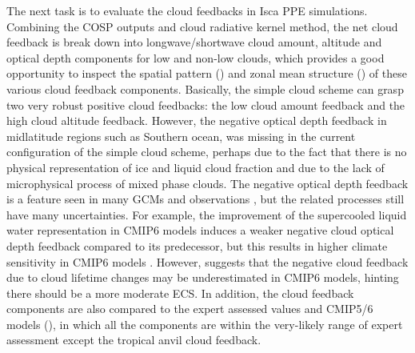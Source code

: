 

The next task is to evaluate the cloud feedbacks in Isca PPE simulations. Combining the COSP outputs and cloud radiative kernel method, the net cloud feedback is break down into longwave/shortwave cloud amount, altitude and optical depth components for low and non-low clouds, which provides a good opportunity to inspect the spatial pattern () and zonal mean structure () of these various cloud feedback components. Basically, the simple cloud scheme can grasp two very robust positive cloud feedbacks: the low cloud amount feedback and the high cloud altitude feedback. However, the negative optical depth feedback in midlatitude regions such as Southern ocean, was missing in the current configuration of the simple cloud scheme,  perhaps due to the fact that there is no physical representation of ice and liquid cloud fraction and due to the lack of microphysical process of mixed phase clouds. The negative optical depth feedback is a feature seen in many GCMs \citep[e.g.,][]{Zelinka2016insights,Zelinka2020causes} and observations \citep[e.g.,][]{Tan2016observational}, but the related processes still have many uncertainties. For example, the improvement of the supercooled liquid water representation in CMIP6 models induces a weaker negative cloud optical depth feedback compared to its predecessor, but this results in higher climate sensitivity in CMIP6 models \citep{Zelinka2020causes}. However, \cite{Mulmenstadt2021underestimated} suggests that the negative cloud feedback due to cloud lifetime changes may be underestimated in CMIP6 models, hinting there should be a more moderate ECS. In addition, the cloud feedback components are also compared to the expert assessed values \citep{Sherwood2020} and CMIP5/6 models (), in which all the components are within the very-likely range of expert assessment except the tropical anvil cloud feedback.


